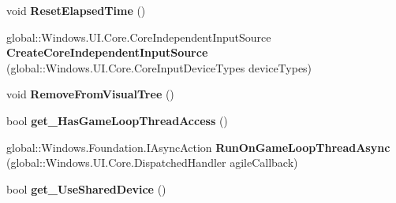 \begin{DoxyCompactItemize}
\item 
\mbox{\label{class_microsoft_1_1_graphics_1_1_canvas_1_1_u_i_1_1_xaml_1_1_canvas_animated_control_a67e1902d3b1e4a138ec3280e41e309d1}} 
void {\bfseries Reset\+Elapsed\+Time} ()
\item 
\mbox{\label{class_microsoft_1_1_graphics_1_1_canvas_1_1_u_i_1_1_xaml_1_1_canvas_animated_control_a76d5f55f3181192f77d2b72cdfdaee78}} 
global\+::\+Windows.\+U\+I.\+Core.\+Core\+Independent\+Input\+Source {\bfseries Create\+Core\+Independent\+Input\+Source} (global\+::\+Windows.\+U\+I.\+Core.\+Core\+Input\+Device\+Types device\+Types)
\item 
\mbox{\label{class_microsoft_1_1_graphics_1_1_canvas_1_1_u_i_1_1_xaml_1_1_canvas_animated_control_a8c050c528e9a7e6420d73b876e6076c0}} 
void {\bfseries Remove\+From\+Visual\+Tree} ()
\item 
\mbox{\label{class_microsoft_1_1_graphics_1_1_canvas_1_1_u_i_1_1_xaml_1_1_canvas_animated_control_a2b8dde3fa5be471394533ca75407cea5}} 
bool {\bfseries get\+\_\+\+Has\+Game\+Loop\+Thread\+Access} ()
\item 
\mbox{\label{class_microsoft_1_1_graphics_1_1_canvas_1_1_u_i_1_1_xaml_1_1_canvas_animated_control_a4cfd047932cd7d4165b53982ff676126}} 
global\+::\+Windows.\+Foundation.\+I\+Async\+Action {\bfseries Run\+On\+Game\+Loop\+Thread\+Async} (global\+::\+Windows.\+U\+I.\+Core.\+Dispatched\+Handler agile\+Callback)
\item 
\mbox{\label{class_microsoft_1_1_graphics_1_1_canvas_1_1_u_i_1_1_xaml_1_1_canvas_animated_control_a4ecc9ba2b48c0c82c98292d4c56ce566}} 
bool {\bfseries get\+\_\+\+Use\+Shared\+Device} ()
\item 
\mbox{\label{class_microsoft_1_1_graphics_1_1_canvas_1_1_u_i_1_1_xaml_1_1_canvas_animated_control_a4cf16f645c5c041b2789957edfabba6f}} 

\end{DoxyCompactItemize}

